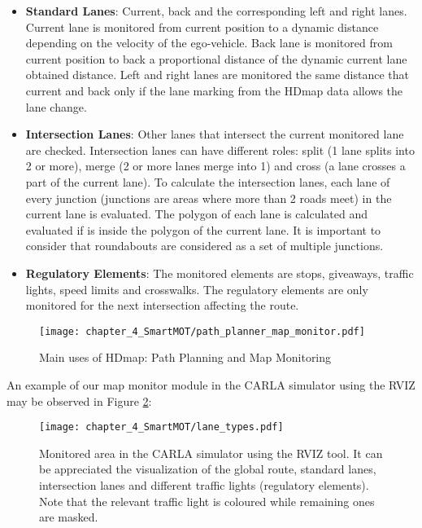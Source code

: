 \begin{itemize}
	
	\item \textbf{Standard Lanes}: Current, back and the corresponding left and right lanes. Current lane is monitored from current position to a dynamic distance depending on the velocity of the ego-vehicle. Back lane is monitored from current position to back a proportional distance of the dynamic current lane obtained distance. Left and right lanes are monitored the same distance that current and back only if the lane marking from the \ac{HDmap} data allows the lane change.
	
	\item \textbf{Intersection Lanes}: Other lanes that intersect the current monitored lane are checked. Intersection lanes can have different roles: split (1 lane splits into 2 or more), merge (2 or more lanes merge into 1) and cross (a lane crosses a part of the current lane). To calculate the intersection lanes, each lane of every junction (junctions are areas where more than 2 roads meet) in the current lane is evaluated. The polygon of each lane is calculated and evaluated if is inside the polygon of the current lane. It is important to consider that roundabouts are considered as a set of multiple junctions. 
	
	\item \textbf{Regulatory Elements}: The monitored elements are stops, giveaways, traffic lights, speed limits and crosswalks. The regulatory elements are only monitored for the next intersection affecting the route. 
	
\end{itemize}

\begin{figure}[] 
	\centering
	\texttt{[image: chapter\_4\_SmartMOT/path\_planner\_map\_monitor.pdf]}
	\caption{Main uses of \ac{HDmap}: Path Planning and Map Monitoring}
	\label{fig:chapter_4_SmartMOT/path_planner_map_monitor}
\end{figure}

An example of our map monitor module in the CARLA simulator \cite{dosovitskiy2017carla} using the \ac{RVIZ} \cite{quigley2009ros} may be observed in Figure \ref{fig:chapter_4_SmartMOT/monitored_area_CARLA_ROS}:

\begin{figure}[h] 
	\centering
	\texttt{[image: chapter\_4\_SmartMOT/lane\_types.pdf]}
	\captionsetup{justification=justified}
	\caption[Monitored area in the CARLA simulator using the \ac{RVIZ} tool]{Monitored area in the CARLA simulator using the \ac{RVIZ} tool. It can be appreciated the visualization of the global route, standard lanes, intersection lanes and different traffic lights (regulatory elements). Note that the relevant traffic light is coloured while remaining ones are masked.}
	\label{fig:chapter_4_SmartMOT/monitored_area_CARLA_ROS}
\end{figure}

